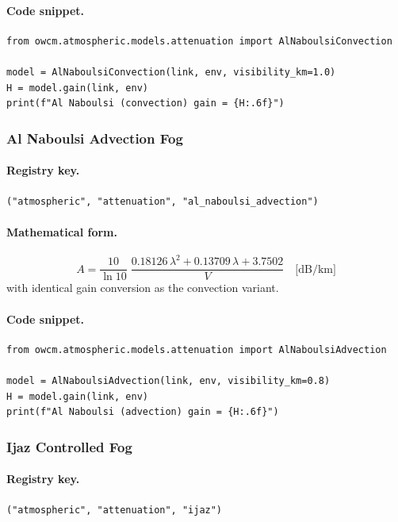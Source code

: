 \documentclass[11pt,a4paper]{article}
\begin{document}
\paragraph{Code snippet.}
\begin{lstlisting}
from owcm.atmospheric.models.attenuation import AlNaboulsiConvection

model = AlNaboulsiConvection(link, env, visibility_km=1.0)
H = model.gain(link, env)
print(f"Al Naboulsi (convection) gain = {H:.6f}")
\end{lstlisting}

\subsubsection{Al Naboulsi Advection Fog}
\label{sec:al_naboulsi_adv}

\paragraph{Registry key.} \texttt{("atmospheric", "attenuation", "al\_naboulsi\_advection")}

\paragraph{Mathematical form.}
\begin{equation}
\boxed{A = \frac{10}{\ln 10}\;\frac{0.18126\,\lambda^2 + 0.13709\,\lambda + 3.7502}{V}
\quad \text{[dB/km]}}
\end{equation}
with identical gain conversion as the convection variant.

\paragraph{Code snippet.}
\begin{lstlisting}
from owcm.atmospheric.models.attenuation import AlNaboulsiAdvection

model = AlNaboulsiAdvection(link, env, visibility_km=0.8)
H = model.gain(link, env)
print(f"Al Naboulsi (advection) gain = {H:.6f}")
\end{lstlisting}

\subsubsection{Ijaz Controlled Fog}
\label{sec:ijaz}

\paragraph{Registry key.} \texttt{("atmospheric", "attenuation", "ijaz")}
\end{document}
